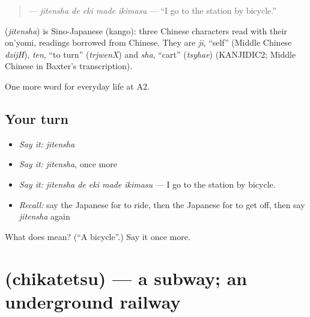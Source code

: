 \begin{quote}
\textbf{  } — \emph{jitensha de eki made ikimasu} — \textquotedblleft{}I go to the station by bicycle.\textquotedblright{}
\end{quote}

\begin{cousinweb}
\textbf{} (\emph{jitensha}) is Sino-Japanese (kango): three Chinese characters read with their on'yomi, readings borrowed from Chinese. They are \emph{ji}, \textquotedblleft{}self\textquotedblright{} (Middle Chinese \emph{dzijH}), \emph{ten}, \textquotedblleft{}to turn\textquotedblright{} (\emph{trjwenX}) and \emph{sha}, \textquotedblleft{}cart\textquotedblright{} (\emph{tsyhae}) (KANJIDIC2; Middle Chinese in Baxter's transcription).
\end{cousinweb}

\begin{grammarlens}[title={What you've built}]
One more word for everyday life at A2.
\end{grammarlens}

\subsection*{Your turn}
\begin{itemize}
\raggedright
  \item \emph{Say it:} \emph{jitensha}
  \item \emph{Say it:} \emph{jitensha}, once more
  \item \emph{Say it:} \emph{jitensha de eki made ikimasu} — I go to the station by bicycle.
  \item \emph{Recall:} say the Japanese for to ride, then the Japanese for to get off, then say \emph{jitensha} again
\end{itemize}

\begin{tcolorbox}[breakable,colback=teal!4,colframe=teal!35!black,title={Before you move on}]
What does  mean? (\textquotedblleft{}A bicycle\textquotedblright{}.) Say it once more.
\end{tcolorbox}
\section[\texorpdfstring{\ja{ちかてつ} (chikatetsu)}{ちかてつ (chikatetsu)}]{ (chikatetsu) — a subway; an underground railway}

\label{lesson:JA-C198-chikatetsu}



